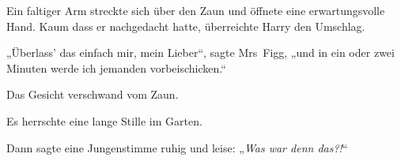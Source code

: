 Ein faltiger Arm streckte sich über den Zaun und öffnete eine erwartungsvolle Hand. Kaum dass er nachgedacht hatte, überreichte Harry den Umschlag.

„Überlass' das einfach mir, mein Lieber“, sagte Mrs~Figg, „und in ein oder zwei Minuten werde ich jemanden vorbeischicken.“

Das Gesicht verschwand vom Zaun.

Es herrschte eine lange Stille im Garten.

Dann sagte eine Jungenstimme ruhig und leise: „\emph{Was war denn das?!}“
